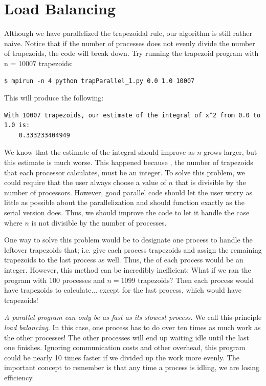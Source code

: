 \section*{Load Balancing}
Although we have parallelized the trapezoidal rule, our algorithm is still rather naive. Notice that if the number of processes does not evenly divide the number of trapezoids, the code will break down. Try running the trapezoid program with n = 10007 trapezoids:
\begin{lstlisting}[style=ShellInput]
$ mpirun -n 4 python trapParallel_1.py 0.0 1.0 10007
\end{lstlisting}
This will produce the following:
\begin{lstlisting}[style=ShellOutput]
With 10007 trapezoids, our estimate of the integral of x^2 from 0.0 to 1.0 is:
    0.333233404949
\end{lstlisting}

We know that the estimate of the integral should improve as $n$ grows larger, but this estimate is much worse. This happened because , the number of trapezoids that each processor calculates, must be an integer. To solve this problem, we could require that the user always choose a value of $n$ that is divisible by the number of processors. However, good parallel code should let the user worry as little as possible about the parallelization and should function exactly as the serial version does. Thus, we should improve the code to let it handle the case where $n$ is not divisible by the number of processes.

One way to solve this problem would be to designate one process to handle the leftover trapezoids that; i.e. give each process  trapezoids and assign the remaining  trapezoids to the last process as well. Thus, the  of each process would be an integer. However, this method can be incredibly inefficient: What if we ran the program with $100$ processes and $n=1099$ trapezoids? Then each process would have  trapezoids to calculate... except for the last process, which would have  trapezoids!

\emph{A parallel program can only be as fast as its slowest process.} We call this principle \emph{load balancing}. In this case, one process has to do over ten times as much work as the other processes! The other processes will end up waiting idle until the last one finishes. Ignoring communication costs and other overhead, this program could be nearly 10 times faster if we divided up the work more evenly. The important concept to remember is that any time a process is idling, we are losing efficiency.


